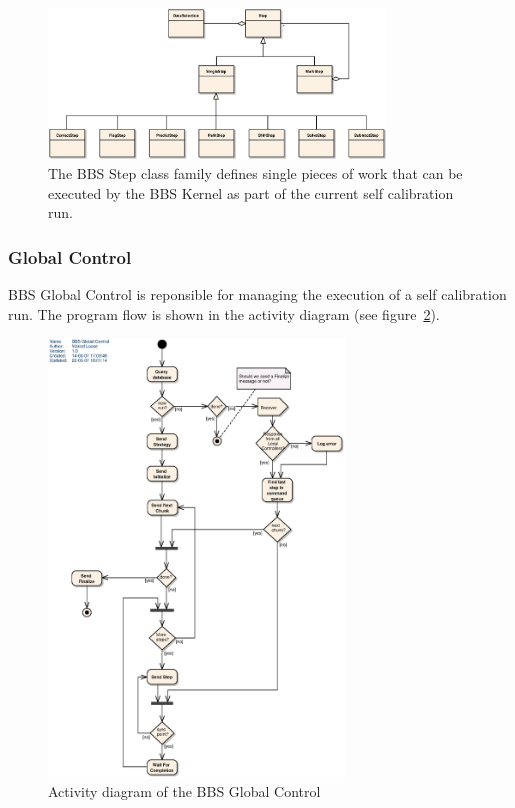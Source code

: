 \documentclass[10pt]{lofar}
\begin{document}
\begin{figure}[!ht]
\centering
\includegraphics[width=0.8\textwidth]{images/bbs-step-class-diagram}
\caption{The BBS Step class family defines single pieces of work that can be
executed by the BBS Kernel as part of the current self calibration run.}
\label{fig:bbsstep}
\end{figure}

\subsubsection{Global Control} \label{subsubsec:design-global-control} BBS
Global Control is reponsible for managing the execution of a self calibration
run. The program flow is shown in the activity diagram (see
figure~\ref{fig:global-control-activity-diagram}).

\begin{figure}[!ht]
\centering
\includegraphics[width=0.7\textwidth]{images/bbs-global-control-activity-diagram}
\caption{Activity diagram of the BBS Global Control}
\label{fig:global-control-activity-diagram}
\end{figure}
\end{document}
